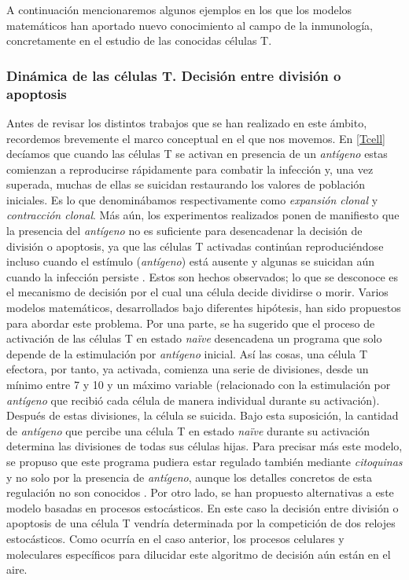 A continuación mencionaremos algunos ejemplos en los que los modelos matemáticos han aportado nuevo conocimiento al campo de la inmunología, concretamente en el estudio de las conocidas células T. 


\subsubsection{Dinámica de las células T. Decisión entre división o apoptosis}
\label{cuestionAmodelizar}

Antes de revisar los distintos trabajos que se han realizado en este ámbito, recordemos brevemente el marco conceptual en el que nos movemos. En \ref{Tcell} decíamos que cuando las células T se activan en presencia de un \textit{antígeno} estas comienzan a reproducirse rápidamente para combatir la infección y, una vez superada, muchas de ellas se suicidan restaurando los valores de población iniciales. Es lo que denominábamos respectivamente como \textit{expansión clonal} y \textit{contracción clonal}. Más aún, los experimentos realizados ponen de manifiesto que la presencia del \textit{antígeno} no es suficiente para desencadenar la decisión de división o apoptosis, ya que las células T activadas continúan reproduciéndose incluso cuando el estímulo (\textit{antígeno}) está ausente y algunas se suicidan aún cuando la infección persiste \citep{JTB}. Estos son hechos observados; lo que se desconoce es el mecanismo de decisión por el cual una célula decide dividirse o morir. Varios modelos matemáticos, desarrollados bajo diferentes hipótesis, han sido propuestos para abordar este problema. Por una parte, se ha sugerido que el proceso de activación de las células T en estado \textit{naïve} desencadena un programa que solo depende de la estimulación por \textit{antígeno} inicial. Así las cosas, una célula T efectora, por tanto, ya activada, comienza una serie de divisiones, desde un mínimo entre 7 y 10 y un máximo variable (relacionado con la estimulación por \textit{antígeno} que recibió cada célula de manera individual durante su activación). Después de estas divisiones, la célula se suicida. Bajo esta suposición, la cantidad de \textit{antígeno} que percibe una célula T en estado \textit{naïve} durante su activación determina las divisiones de todas sus células hijas. Para precisar más este modelo, se propuso que este programa pudiera estar regulado también mediante \textit{citoquinas} y no solo por la presencia de \textit{antígeno}, aunque los detalles concretos de esta regulación no son conocidos \citep{JTB}. Por otro lado, se han propuesto alternativas a este modelo basadas en procesos estocásticos. En este caso la decisión entre división o apoptosis de una célula T vendría determinada por la competición de dos relojes estocásticos. Como ocurría en el caso anterior, los procesos celulares y moleculares específicos para dilucidar este algoritmo de decisión aún están en el aire. 

